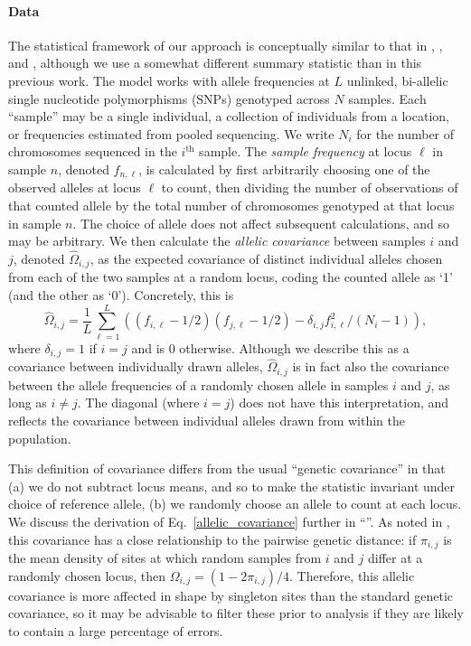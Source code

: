 \documentclass[10pt,letterpaper]{article}
\newcommand{\secref}[1]{``\nameref{#1}''}
\begin{document}
\paragraph{Data}
The statistical framework of our approach is conceptually similar to that in \cite{Wasser2004}, \cite{BEDASSLE}, and \cite{spacemix},
although we use a somewhat different summary statistic than in this previous work.
The model works with allele frequencies at $L$ unlinked, bi-allelic single nucleotide polymorphisms (SNPs) genotyped across $N$ samples.
Each ``sample'' may be a single individual,  
a collection of individuals from a location, 
or frequencies estimated from pooled sequencing.
We write $N_i$ for the number of chromosomes sequenced in the $i^\text{th}$ sample.
The \emph{sample frequency} at locus $\ell$ in sample $n$, denoted $f_{n,\ell}$, 
is calculated by first arbitrarily choosing one of the observed alleles at locus $\ell$ to count, 
then dividing the number of observations of that counted allele by the total number of chromosomes genotyped at that locus
in sample $n$.
The choice of allele does not affect subsequent calculations, and so may be arbitrary.
We then calculate the \emph{allelic covariance} between samples $i$ and $j$, denoted $\widehat{\Omega}_{i,j}$,
as the expected covariance of distinct individual alleles 
chosen from each of the two samples at a random locus,
coding the counted allele as `1' (and the other as `0').
Concretely, this is
\begin{equation}
\widehat{\Omega}_{i,j} = 
    \frac{1}{L} \sum_{\ell=1}^L \left( (f_{i,\ell}-1/2) (f_{j,\ell}-1/2) - \delta_{i,j} f_{i,\ell}^2 / (N_i-1) \right),
\label{allelic_covariance}
\end{equation}
where $\delta_{i,j}=1$ if $i=j$ and is 0 otherwise.
Although we describe this as a covariance between individually drawn alleles,
$\widehat{\Omega}_{i,j}$ is in fact also the covariance between the allele frequencies
of a randomly chosen allele in samples $i$ and $j$, as long as $i \neq j$.
The diagonal (where $i=j$) does not have this interpretation, 
and reflects the covariance between individual alleles drawn from within the population.

This definition of covariance differs from the usual ``genetic covariance'' \cite{mcvean_genealogical_2009}
in that (a) we do not subtract locus means,
and so to make the statistic invariant under choice of reference allele, 
(b) we randomly choose an allele to count at each locus.
We discuss the derivation of Eq.\ \eqref{allelic_covariance} further in \secref{allelic_cov}.
As noted in \cite{EEMS},
this covariance has a close relationship to the pairwise genetic distance:
if $\pi_{i,j}$ is the mean density of sites at which random samples from $i$ and $j$ differ at a randomly chosen locus,
then $\Omega_{i,j} = (1 - 2 \pi_{i,j})/4$.
Therefore, 
this allelic covariance is more affected in shape by singleton sites
than the standard genetic covariance,
so it may be advisable to filter these prior to analysis
if they are likely to contain a large percentage of errors.
\end{document}
